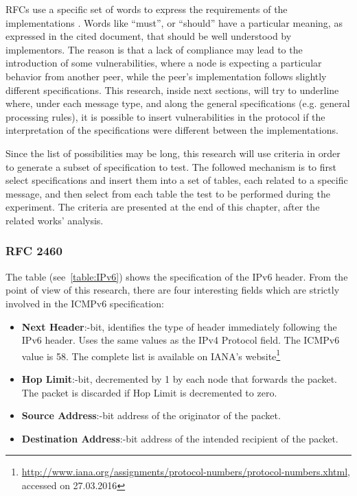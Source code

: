 \documentclass[12pt]{article}
\begin{document}
RFCs use a specific set of words to express the requirements of the implementations \cite{rfc2119}. Words like ``must'', or ``should'' have a particular meaning, as expressed in the cited document, that should be well understood by implementors. The reason is that a lack of compliance may lead to the introduction of some vulnerabilities, where a node is expecting a particular behavior from another peer, while the peer's implementation follows slightly different specifications. This research, inside next sections, will try to underline where, under each message type, and along the general specifications (e.g. general processing rules), it is possible to insert vulnerabilities in the protocol if the interpretation of the specifications were different between the implementations.

Since the list of possibilities may be long, this research will use criteria in order to generate a subset of specification to test. The followed mechanism is to first select specifications and insert them into a set of tables, each related to a specific message, and then select from each table the test to be performed during the experiment. The criteria are presented at the end of this chapter, after the related works' analysis.

\pagebreak

\subsubsection{RFC 2460}
\label{subsub:2460}
The table (see~\ref{table:IPv6}) shows the specification of the IPv6 header. From the point of view of this research, there are four interesting fields which are strictly involved in the ICMPv6 specification:
\vspace{-15pt}
\begin{itemize}[noitemsep,topsep=0pt,partopsep=0pt]
 \item \textbf{Next Header}:-bit, identifies the type of header immediately following the IPv6 header. Uses the same values as the IPv4 Protocol field. The ICMPv6 value is 58. The complete list is available on IANA's website\footnote{\url{http://www.iana.org/assignments/protocol-numbers/protocol-numbers.xhtml}, accessed on 27.03.2016}
 \item \textbf{Hop Limit}:-bit, decremented by 1 by each node that forwards the packet. The packet is discarded if Hop Limit is decremented to zero.
 \item \textbf{Source Address}:-bit address of the originator of the packet.
 \item \textbf{Destination Address}:-bit address of the intended recipient of the packet.
\end{itemize}
\end{document}
